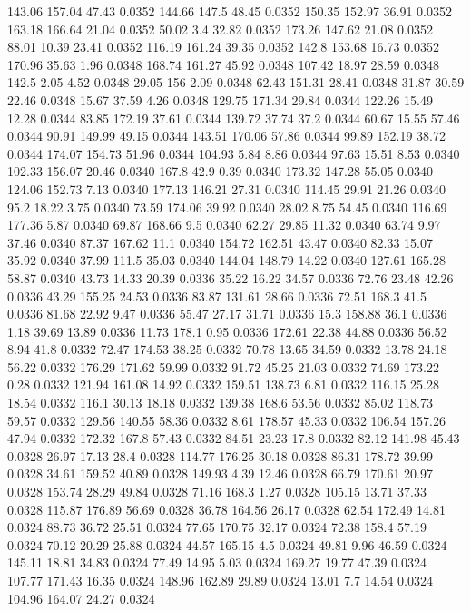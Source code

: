 143.06	157.04	47.43	0.0352
144.66	147.5	48.45	0.0352
150.35	152.97	36.91	0.0352
163.18	166.64	21.04	0.0352
50.02	3.4	32.82	0.0352
173.26	147.62	21.08	0.0352
88.01	10.39	23.41	0.0352
116.19	161.24	39.35	0.0352
142.8	153.68	16.73	0.0352
170.96	35.63	1.96	0.0348
168.74	161.27	45.92	0.0348
107.42	18.97	28.59	0.0348
142.5	2.05	4.52	0.0348
29.05	156	2.09	0.0348
62.43	151.31	28.41	0.0348
31.87	30.59	22.46	0.0348
15.67	37.59	4.26	0.0348
129.75	171.34	29.84	0.0344
122.26	15.49	12.28	0.0344
83.85	172.19	37.61	0.0344
139.72	37.74	37.2	0.0344
60.67	15.55	57.46	0.0344
90.91	149.99	49.15	0.0344
143.51	170.06	57.86	0.0344
99.89	152.19	38.72	0.0344
174.07	154.73	51.96	0.0344
104.93	5.84	8.86	0.0344
97.63	15.51	8.53	0.0340
102.33	156.07	20.46	0.0340
167.8	42.9	0.39	0.0340
173.32	147.28	55.05	0.0340
124.06	152.73	7.13	0.0340
177.13	146.21	27.31	0.0340
114.45	29.91	21.26	0.0340
95.2	18.22	3.75	0.0340
73.59	174.06	39.92	0.0340
28.02	8.75	54.45	0.0340
116.69	177.36	5.87	0.0340
69.87	168.66	9.5	0.0340
62.27	29.85	11.32	0.0340
63.74	9.97	37.46	0.0340
87.37	167.62	11.1	0.0340
154.72	162.51	43.47	0.0340
82.33	15.07	35.92	0.0340
37.99	111.5	35.03	0.0340
144.04	148.79	14.22	0.0340
127.61	165.28	58.87	0.0340
43.73	14.33	20.39	0.0336
35.22	16.22	34.57	0.0336
72.76	23.48	42.26	0.0336
43.29	155.25	24.53	0.0336
83.87	131.61	28.66	0.0336
72.51	168.3	41.5	0.0336
81.68	22.92	9.47	0.0336
55.47	27.17	31.71	0.0336
15.3	158.88	36.1	0.0336
1.18	39.69	13.89	0.0336
11.73	178.1	0.95	0.0336
172.61	22.38	44.88	0.0336
56.52	8.94	41.8	0.0332
72.47	174.53	38.25	0.0332
70.78	13.65	34.59	0.0332
13.78	24.18	56.22	0.0332
176.29	171.62	59.99	0.0332
91.72	45.25	21.03	0.0332
74.69	173.22	0.28	0.0332
121.94	161.08	14.92	0.0332
159.51	138.73	6.81	0.0332
116.15	25.28	18.54	0.0332
116.1	30.13	18.18	0.0332
139.38	168.6	53.56	0.0332
85.02	118.73	59.57	0.0332
129.56	140.55	58.36	0.0332
8.61	178.57	45.33	0.0332
106.54	157.26	47.94	0.0332
172.32	167.8	57.43	0.0332
84.51	23.23	17.8	0.0332
82.12	141.98	45.43	0.0328
26.97	17.13	28.4	0.0328
114.77	176.25	30.18	0.0328
86.31	178.72	39.99	0.0328
34.61	159.52	40.89	0.0328
149.93	4.39	12.46	0.0328
66.79	170.61	20.97	0.0328
153.74	28.29	49.84	0.0328
71.16	168.3	1.27	0.0328
105.15	13.71	37.33	0.0328
115.87	176.89	56.69	0.0328
36.78	164.56	26.17	0.0328
62.54	172.49	14.81	0.0324
88.73	36.72	25.51	0.0324
77.65	170.75	32.17	0.0324
72.38	158.4	57.19	0.0324
70.12	20.29	25.88	0.0324
44.57	165.15	4.5	0.0324
49.81	9.96	46.59	0.0324
145.11	18.81	34.83	0.0324
77.49	14.95	5.03	0.0324
169.27	19.77	47.39	0.0324
107.77	171.43	16.35	0.0324
148.96	162.89	29.89	0.0324
13.01	7.7	14.54	0.0324
104.96	164.07	24.27	0.0324
